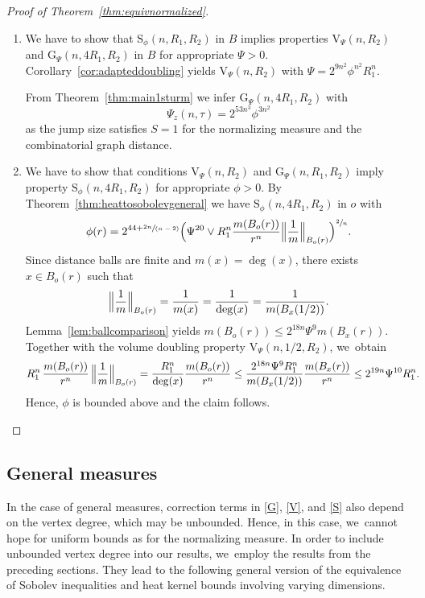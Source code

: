\documentclass[JEP,XML,SOM,Unicode,published]{cedram}
\newenvironment{enumeratei}
{\bgroup\def\theenumi{\roman{enumi}}\def\theenumii{\arabic{enumii}}\begin{enumerate}}
{\end{enumerate}\egroup}
\newcommand{\spfrac}[2]{\sfrac{#1}{(#2)}}
\newcommand{\rG}{\mathrm{G}}
\newcommand{\rS}{\mathrm{S}}
\newcommand{\rV}{\mathrm{V}}
\theoremstyle{plain}
\theoremstyle{definition}
\begin{document}
\skpt
\begin{proof}[Proof of Theorem~\ref{thm:equivnormalized}]
\begin{enumeratei}
\item
We have to show that $\rS_{\phi}(n,R_1,R_2)$ in $B$ implies properties $\rV_{{\Psi}}(n,R_2)$ and $\rG_{\Psi}(n,4R_1,R_2)$ in $B$ for appropriate $\Psi>0$.
Corollary~\ref{cor:adapteddoubling} yields $\rV_{{\Psi}}(n,R_2)$ with ${{\Psi}}=2^{{9}n^2}\phi^{n^2} R_1^n$.

From Theorem~\ref{thm:main1sturm} we infer $\rG_\Psi(n,4R_1,R_2)$ with
\[
\Psi_z(n,\tau)=2^{53n^3}\phi
^{3n^2}
\]
as the jump size satisfies $ S=1 $ for the normalizing measure and the combinatorial graph distance.

\item
We have to show that conditions $\rV_{{{\Psi}}}(n,R_2)$ and $\rG_{\Psi}(n,R_1,R_2)$ imply property $\rS_{\phi}(n,4R_1,R_2)$ for appropriate $\phi>0$. By Theorem~\ref{thm:heattosobolevgeneral} we have $\rS_{\phi}(n,4R_1,R_2)$ in $o$ with
\[
\phi(r)=2^{44+\spfrac{2n}{n-2}}\Bigl({\Psi^{20}}\vee R_1^{n}\frac{m(B_o(r))}{r^{n}}\Bigl\|\frac{1}{m}\Bigr\|_{B_o(r)}\Bigr)^{\sfrac{2}{n}}.
\]
Since distance balls are finite and $m(x)=\deg(x)$, there exists $x\in B_o(r)$ such that
\[
\Bigl\|\frac{1}{m}\Bigr\|_{B_o(r)}=\frac{1}{m(x)}=\frac{1}{\deg(x)}=\frac{1}{m(B_x(1/2))}.
\]
Lemma~\ref{lem:ballcomparison} yields $m(B_o(r))\leq 2^{18n}{{\Psi^9}}m(B_x(r))$. Together with the volume doubling property $\rV_{{\Psi}}(n,1/2,R_2)$, we~obtain
\begin{align*}
R_1^{n}\,\frac{m(B_{o}(r))}{r^{n}}\,\Bigl\|\frac{1}{m}\Bigr\|_{B_o(r)}
=\frac{R_1^{n}}{\deg(x)}\frac{m(B_{o}(r))}{r^{n}}
\leq \frac{2^{18n}{{\Psi^9}} R_1^{n}}{m(B_x(1/2))}\frac{m(B_{x}(r))}{r^{n}}
&\leq 2^{19n}{{\Psi^{10}}}R_1^n.
\end{align*}
Hence, $\phi$ is bounded above and the claim follows.\qedhere
\end{enumeratei}
\end{proof}

\subsection*{{General measures}}
In the case of general measures, correction terms in \eqref{G}, \eqref{V}, and \eqref{S} also depend on the vertex degree, which may be unbounded.
{Hence, in this case, we~cannot hope for uniform bounds as for the normalizing measure.
} In order to include unbounded vertex degree into our results, we~employ the results from the preceding sections. They lead to the following general version of the equivalence of Sobolev inequalities and heat kernel bounds involving varying dimensions.
\end{document}
